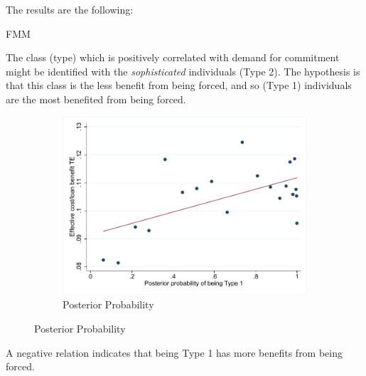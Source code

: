 \documentclass[oneside,11pt]{article}
\begin{document}
The results are the following:

\begin{table}[H]
\caption{FMM}
\label{iv_pf}
\begin{center}
\scriptsize{}
\end{center}
 \scriptsize

\end{table}



The class (type) which is positively correlated with demand for commitment might be identified with the \emph{sophisticated} individuals (Type 2). The hypothesis is that this class is the less benefit from being forced, and so (Type 1) individuals are the most benefited from being forced.

\begin{figure}[H]
    \caption{Probability of being Type 1 vs HTE}
    \label{}
    \begin{center}
    \begin{subfigure}{0.7\textwidth}
        \caption{Posterior Probability}
        \centering
        \includegraphics[width=\textwidth]{Figuras/binscatter_tau_classpost.pdf}
    \end{subfigure}
  
    \end{center}
     \scriptsize 
\end{figure}

A negative relation indicates that being Type 1 has more benefits from being forced.
\end{document}
